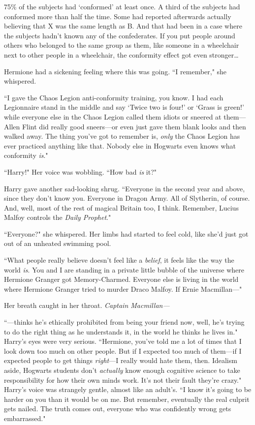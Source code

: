 75\% of the subjects had `conformed' at least once. A third of the subjects had conformed more than half the time. Some had reported afterwards actually believing that X was the same length as B\@. And that had been in a case where the subjects hadn't known any of the confederates. If you put people around others who belonged to the same group as them, like someone in a wheelchair next to other people in a wheelchair, the conformity effect got even stronger{\ldots}

Hermione had a sickening feeling where this was going. ``I remember," she whispered.

``I gave the Chaos Legion anti-conformity training, you know. I had each Legionnaire stand in the middle and say `Twice two is four!' or `Grass is green!' while everyone else in the Chaos Legion called them idiots or sneered at them—Allen Flint did really good sneers—or even just gave them blank looks and then walked away. The thing you've got to remember is, \emph{only} the Chaos Legion has ever practiced anything like that. Nobody else in Hogwarts even knows what conformity \emph{is}."

``Harry!" Her voice was wobbling. ``How bad \emph{is} it?"

Harry gave another sad-looking shrug. ``Everyone in the second year and above, since they don't know you. Everyone in Dragon Army. All of Slytherin, of course. And, well, most of the rest of magical Britain too, I think. Remember, Lucius Malfoy controls the \emph{Daily Prophet}."

``Everyone?" she whispered. Her limbs had started to feel cold, like she'd just got out of an unheated swimming pool.

``What people really believe doesn't feel like a \emph{belief}, it feels like the way the world \emph{is}. You and I are standing in a private little bubble of the universe where Hermione Granger got Memory-Charmed. Everyone else is living in the world where Hermione Granger tried to murder Draco Malfoy. If Ernie Macmillan—"

Her breath caught in her throat. \emph{Captain Macmillan—}

``—thinks he's ethically prohibited from being your friend now, well, he's trying to do the right thing as he understands it, in the world he thinks he lives in." Harry's eyes were very serious. ``Hermione, you've told me a lot of times that I look down too much on other people. But if I expected too much of them—if I expected people to get things \emph{right}—I really would hate them, then. Idealism aside, Hogwarts students don't \emph{actually} know enough cognitive science to take responsibility for how their own minds work. It's not their fault they're crazy." Harry's voice was strangely gentle, almost like an adult's. ``I know it's going to be harder on you than it would be on me. But remember, eventually the real culprit gets nailed. The truth comes out, everyone who was confidently wrong gets embarrassed."

